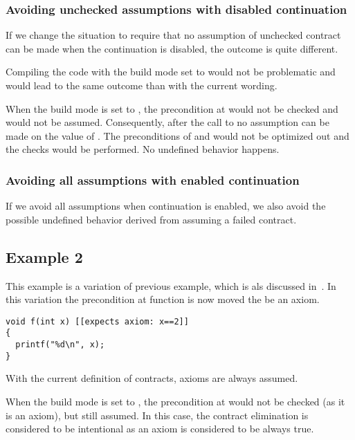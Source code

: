 \subsubsection{Avoiding unchecked assumptions with disabled continuation}

If we change the situation to require that no assumption of unchecked contract
can be made when the continuation is disabled, the outcome is quite different.

Compiling the code with the build mode set to  would not be
problematic and would lead to the same outcome than with the current wording.

When the build mode is set to , the precondition at
 would not be checked and would not be assumed. Consequently, after
the call to  no assumption can be made on the value of
. The preconditions of  and  would not be
optimized out and the checks would be performed. No undefined behavior happens.

\subsubsection{Avoiding all assumptions with enabled continuation}

If we avoid all assumptions when continuation is enabled, we also avoid the
possible undefined behavior derived from assuming a failed contract.

\subsection{Example 2}

This example is a variation of previous example, which is als discussed
in~\cite{p1321r0}. In this variation the precondition at function  is
now moved the be an axiom.

\begin{lstlisting}
void f(int x) [[expects axiom: x==2]]
{
  printf("%d\n", x);
}
\end{lstlisting}

With the current definition of contracts, axioms are always assumed.

When the build mode is set to , the precondition at
 would not be checked (as it is an axiom), but still assumed.
In this case, the contract elimination is considered to be intentional as
an axiom is considered to be always true.

